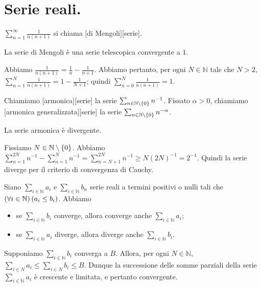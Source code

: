 \section{Serie reali.}\label{SerieReali}
\begin{Definition}
	$\sum_{n = 1}^\infty \frac{1}{n(n + 1)}$ si chiama [di Mengoli][serie].
\end{Definition}
\begin{Theorem}
	La serie di Mengoli \`e una serie telescopica convergente a $1$.
\end{Theorem}
\Proof Abbiamo $\frac{1}{n(n + 1)} = \frac{1}{n} - \frac{1}{n + 1}$. Abbiamo pertanto, per ogni $N \in \mathbb{N}$ tale che $N > 2$, $\sum_{n = 1}^N \frac{1}{n(n + 1)} = 1 - \frac{1}{N + 1}$; quindi $\sum_{n = 0}^N \frac{1}{n(n + 1)} = 1$. \EndProof
\begin{Definition}
	Chiamiamo [armonica][serie] la serie $\sum_{n \in \mathbb{N} \setminus \lbrace 0 \rbrace} n^{-1}$. Fissato $\alpha > 0$, chiamiamo [armonica generalizzata][serie] la serie $\sum_{n \in \mathbb{N} \setminus \lbrace 0 \rbrace} n^{-\alpha}$.
\end{Definition}
\begin{Theorem}
	La serie armonica \`e divergente.
\end{Theorem}
\Proof Fissiamo $N \in \mathbb{N} \setminus \lbrace 0 \rbrace$. Abbiamo $\sum_{n = 1}^{2N} n^{-1} - \sum_{n = 1}^N n^{-1} = \sum_{n = N + 1}^{2N} n^{-1} \geq N (2N)^{-1} = 2^{-1}$. Quindi la serie diverge per il criterio di convergenza di Cauchy. \EndProof
\begin{Theorem}
	 Siano $\sum_{i \in \mathbb{N}} a_i$ e $\sum_{i \in \mathbb{N}} b_n$ serie reali a termini positivi o nulli tali che $\left ( \forall i \in \mathbb{N} \right ) \left ( a_i \leq b_i \right )$. Abbiamo
	\begin{itemize}
		\item se $\sum_{i \in \mathbb{N}} b_i$ converge, allora converge anche $\sum_{i \in \mathbb{N}} a_i$;
		\item se $\sum_{i \in \mathbb{N}} a_i$ diverge, allora diverge anche $\sum_{i \in \mathbb{N}} b_i$.
	\end{itemize}
\end{Theorem}
\Proof Supponiamo $\sum_{i \in \mathbb{N}} b_i$ converga a $B$. Allora, per ogni $N \in \mathbb{N}$, $\sum_{i \in N} a_i \leq \sum_{i \in N} b_i \leq B$. Dunque la successione delle somme parziali della serie $\sum_{i \in \mathbb{N}} a_i$ \`e crescente e limitata, e pertanto convergente.
